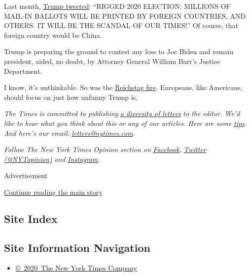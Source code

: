 Last month,
\href{https://twitter.com/realdonaldtrump/status/1275024974579982336}{Trump
tweeted}: ``RIGGED 2020 ELECTION: MILLIONS OF MAIL-IN BALLOTS WILL BE
PRINTED BY FOREIGN COUNTRIES, AND OTHERS. IT WILL BE THE SCANDAL OF OUR
TIMES!'' Of course, that foreign country would be China.

Trump is preparing the ground to contest any loss to Joe Biden and
remain president, aided, no doubt, by Attorney General William Barr's
Justice Department.

I know, it's unthinkable. So was the
\href{https://www.history.com/topics/germany/reichstag-fire}{Reichstag
fire}. Europeans, like Americans, should focus on just how unfunny Trump
is.

\emph{The Times is committed to publishing}
\href{https://www.nytimes.com/2019/01/31/opinion/letters/letters-to-editor-new-york-times-women.html}{\emph{a
diversity of letters}} \emph{to the editor. We'd like to hear what you
think about this or any of our articles. Here are some}
\href{https://help.nytimes.com/hc/en-us/articles/115014925288-How-to-submit-a-letter-to-the-editor}{\emph{tips}}\emph{.
And here's our email:}
\href{mailto:letters@nytimes.com}{\emph{letters@nytimes.com}}\emph{.}

\emph{Follow The New York Times Opinion section on}
\href{https://www.facebook.com/nytopinion}{\emph{Facebook}}\emph{,}
\href{http://twitter.com/NYTOpinion}{\emph{Twitter (@NYTopinion)}}
\emph{and}
\href{https://www.instagram.com/nytopinion/}{\emph{Instagram}}\emph{.}

Advertisement

\protect\hyperlink{after-bottom}{Continue reading the main story}

\hypertarget{site-index}{%
\subsection{Site Index}\label{site-index}}

\hypertarget{site-information-navigation}{%
\subsection{Site Information
Navigation}\label{site-information-navigation}}

\begin{itemize}
\tightlist
\item
  \href{https://help.nytimes.com/hc/en-us/articles/115014792127-Copyright-notice}{©~2020~The
  New York Times Company}
\end{itemize}

